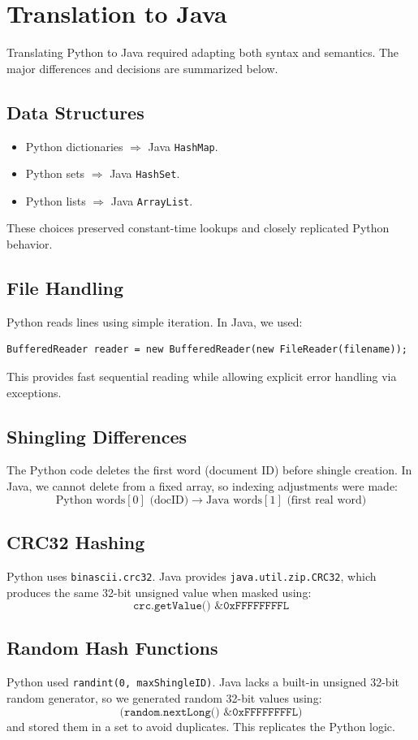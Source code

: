 \documentclass[11pt]{article}
\begin{document}
\section{Translation to Java}
Translating Python to Java required adapting both syntax and semantics. The major differences and decisions are summarized below.

\subsection{Data Structures}
\begin{itemize}[itemsep=4pt]
    \item Python dictionaries $\Rightarrow$ Java \texttt{HashMap}.
    \item Python sets $\Rightarrow$ Java \texttt{HashSet}.
    \item Python lists $\Rightarrow$ Java \texttt{ArrayList}.
\end{itemize}
These choices preserved constant-time lookups and closely replicated Python behavior.

\subsection{File Handling}
Python reads lines using simple iteration. In Java, we used:
\begin{verbatim}
BufferedReader reader = new BufferedReader(new FileReader(filename));
\end{verbatim}
This provides fast sequential reading while allowing explicit error handling via exceptions.

\subsection{Shingling Differences}
The Python code deletes the first word (document ID) before shingle creation. In Java, we cannot delete from a fixed array, so indexing adjustments were made:
\[
\text{Python words}[0] \text{ (docID)} \rightarrow \text{Java words}[1] \text{ (first real word)}
\]

\subsection{CRC32 Hashing}
Python uses \texttt{binascii.crc32}. Java provides \texttt{java.util.zip.CRC32}, which produces the same 32-bit unsigned value when masked using:
\[
\texttt{crc.getValue() \& 0xFFFFFFFFL}
\]

\subsection{Random Hash Functions}
Python used \texttt{randint(0, maxShingleID)}. Java lacks a built-in unsigned 32-bit random generator, so we generated random 32-bit values using:
\[
\texttt{(random.nextLong() \& 0xFFFFFFFFL)}
\]
and stored them in a set to avoid duplicates. This replicates the Python logic.
\end{document}
